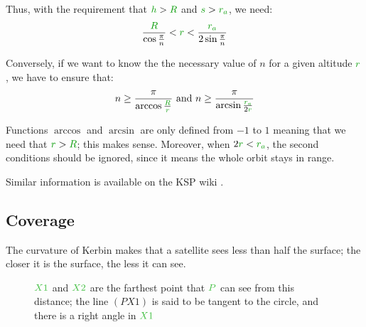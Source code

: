 Thus, with the requirement that $\dist{h} > \dist{R}$ and $\dist{s} >
\dist{r_a}$, we need:
\[
\frac {\dist{R}} {\cos \frac {\pi} n}
<
\dist{r}
<
\frac {\dist{r_a}} {2 \sin \frac {\pi} n}
\]

Conversely, if we want to know the the necessary value of $n$ for a
given altitude $\dist{r}$, we have to ensure that:
\[
n
\ge
\frac {\pi} {\arccos \frac {\dist{R}} {\dist{r}}}
\text{ and }
n
\ge
\frac {\pi} {\arcsin \frac {\dist{r_a}} {2 \dist{r}}}
\]

\begin{remark}
Functions $\arccos$ and $\arcsin$ are only defined from $-1$ to $1$
meaning that we need that $\dist{r} > \dist{R}$; this makes sense.
Moreover, when $2 \dist{r} < \dist{r_a}$, the second conditions should
be ignored, since it means the whole orbit stays in range.
\end{remark}

Similar information is available on the KSP wiki \cite{coverage}.


\subsection{Coverage}

The curvature of Kerbin makes that a satellite sees less than half the
surface; the closer it is the surface, the less it can see.

\begin{figure}[H]
	\centering
	\caption{
		$\posit{X1}$ and $\posit{X2}$ are the farthest point
		that $\posit{P}$ can see from this distance; the line
		$(PX1)$ is said to be tangent to the circle, and there
		is a right angle in $\posit{X1}$
	}
\end{figure}

